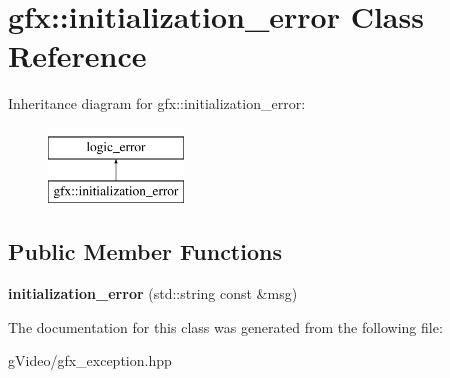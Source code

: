 \hypertarget{classgfx_1_1initialization__error}{\section{gfx\-:\-:initialization\-\_\-error Class Reference}
\label{classgfx_1_1initialization__error}
}
Inheritance diagram for gfx\-:\-:initialization\-\_\-error\-:\begin{figure}[H]
\begin{center}
\leavevmode
\includegraphics[height=2.000000cm]{classgfx_1_1initialization__error}
\end{center}
\end{figure}
\subsection*{Public Member Functions}
\begin{DoxyCompactItemize}
\item 
\hypertarget{classgfx_1_1initialization__error_a37bdd0e6006f04c19e2fb35fd3fb206c}{{\bfseries initialization\-\_\-error} (std\-::string const \&msg)}\label{classgfx_1_1initialization__error_a37bdd0e6006f04c19e2fb35fd3fb206c}

\end{DoxyCompactItemize}


The documentation for this class was generated from the following file\-:\begin{DoxyCompactItemize}
\item 
g\-Video/gfx\-\_\-exception.\-hpp\end{DoxyCompactItemize}
